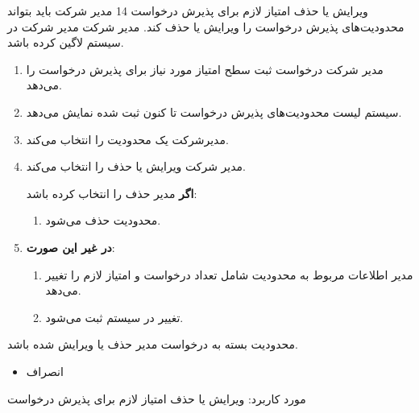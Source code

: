 	{
		\usecase
		{ویرایش یا حذف امتیاز لازم برای پذیرش درخواست}
		{14}
		{مدیر شرکت باید بتواند محدودیت‌های پذیرش درخواست را ویرایش یا حذف کند.}
		{مدیر شرکت}
		{}
		{مدیر شرکت در سیستم لاگین کرده باشد.}
		{
			\vspace*{-0.6cm}
			\begin{enumerate}
				\item مدیر شرکت درخواست ثبت سطح امتیاز مورد نیاز برای پذیرش درخواست را می‌دهد.
				\item سیستم لیست محدودیت‌های پذیرش درخواست تا کنون ثبت شده نمایش می‌دهد.
				\item
				مدیرشرکت یک محدودیت را انتخاب می‌کند.
				\item 
				مدیر شرکت ویرایش یا حذف را انتخاب می‌کند.
				
				\textbf{اگر}
			مدیر حذف را انتخاب کرده باشد:
				\begin{enumerate}[label=\theenumi.\arabic*.]
					\item محدودیت حذف می‌شود.
				\end{enumerate}
				\item
				\textbf{در غیر این صورت}:
				\begin{enumerate}[label=\theenumi.\arabic*.]
					\item مدیر اطلاعات مربوط به محدودیت شامل تعداد درخواست و امتیاز لازم را تغییر می‌دهد.
\item تغییر در سیستم ثبت می‌شود.	
			\end{enumerate}		
			\end{enumerate}
		}
		{محدودیت بسته به درخواست مدیر حذف یا ویرایش شده باشد.}
		{
			\begin{itemize}
				\item
				انصراف
			\end{itemize}
		}
		{
			مورد کاربرد: ویرایش یا حذف امتیاز لازم برای پذیرش درخواست
		}
	}
	
	
	
	
	


